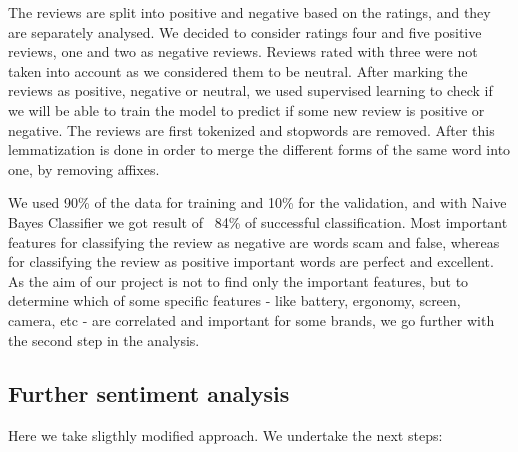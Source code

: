 \documentclass[11pt]{article}
\begin{document}
The reviews are split into positive and negative based on the ratings, and they are separately analysed. We decided to consider ratings four and five positive reviews, one and two as negative reviews. Reviews rated with three were not taken into account as we considered them to be neutral. After marking the reviews as positive, negative or neutral, we used supervised learning to check if we will be able to train the model to predict if some new review is positive or negative. The reviews are first tokenized and stopwords are removed. After this lemmatization is done in order to merge the different forms of the same word into one, by removing affixes. \par

We used 90\% of the data for training and 10\% for the validation, and with Naive Bayes Classifier we got result of ~84\% of successful classification. Most important features for classifying the review as negative are words scam and false, whereas for classifying the review as positive important words are perfect and excellent. As the aim of our project is not to find only the important features, but to determine which of some specific features - like battery, ergonomy, screen, camera, etc - are correlated and important for some brands, we go further with the second step in the analysis. 


\subsection{Further sentiment analysis} 

Here we take sligthly modified approach. We undertake the next steps: 
\end{document}
